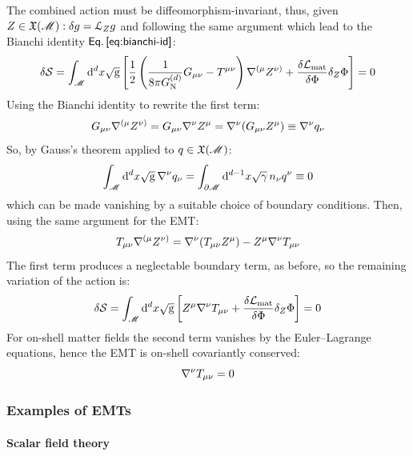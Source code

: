 The combined action  must be diffeomorphism-invariant, thus, given $ Z \in \mathfrak{X}(\mathscr{M}) : \delta g = \EuScript{L}_Z g $ and following the same argument which lead to the Bianchi identity $ \eref{eq:bianchi-id} $:
\begin{equation*}
  \delta \mathcal{S} = \int_\mathscr{M} \mathrm{d}^dx \sqrt{\mathrm{g}} \left[ \frac{1}{2} \left( \frac{1}{8 \pi G_\text{N}^{(d)}} G_{\mu \nu} - T^{\mu \nu} \right) \nabla^{(\mu} Z^{\nu)} + \frac{\delta \mathcal{L}_\text{mat}}{\delta \Phi} \delta_Z \Phi \right] = 0
\end{equation*}
Using the Bianchi identity  to rewrite the first term:
\begin{equation*}
  G_{\mu \nu} \nabla^{(\mu} Z^{\nu)} = G_{\mu \nu} \nabla^\nu Z^\mu = \nabla^\nu (G_{\mu \nu} Z^\mu) \equiv \nabla^\nu q_\nu
\end{equation*}
So, by Gauss's theorem  applied to $ q \in \mathfrak{X}(\mathscr{M}) $:
\begin{equation*}
  \int_\mathscr{M} \mathrm{d}^dx \sqrt{\mathrm{g}} \, \nabla^\nu q_\nu = \int_{\partial \mathscr{M}} \mathrm{d}^{d-1}x \sqrt{\gamma} \, n_\nu q^\nu \equiv 0
\end{equation*}
which can be made vanishing by a suitable choice of boundary conditions. Then, using the same argument for the EMT:
\begin{equation*}
  T_{\mu \nu} \nabla^{(\mu} Z^{\nu)} = \nabla^\nu (T_{\mu \nu} Z^\mu) - Z^\mu \nabla^\nu T_{\mu \nu}
\end{equation*}
The first term produces a neglectable boundary term, as before, so the remaining variation of the action is:
\begin{equation*}
  \delta \mathcal{S} = \int_\mathscr{M} \mathrm{d}^dx \sqrt{\mathrm{g}} \left[ Z^\mu \nabla^\nu T_{\mu \nu} + \frac{\delta \mathcal{L}_\text{mat}}{\delta \Phi} \delta_Z \Phi \right] = 0
\end{equation*}
For on-shell matter fields the second term vanishes by the Euler--Lagrange equations, hence the EMT is on-shell covariantly conserved:
\begin{equation}
  \nabla^\nu T_{\mu \nu} = 0
\end{equation}

\subsubsection{Examples of EMTs}

\paragraph{Scalar field theory}

